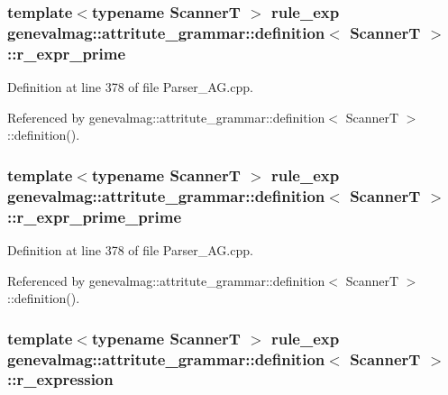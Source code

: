 \hypertarget{structgenevalmag_1_1attritute__grammar_1_1definition_ac8e35c6d00b378efb3015a9e4158f4cf}{
\subsubsection[{r\_\-expr\_\-prime}]{\setlength{\rightskip}{0pt plus 5cm}template$<$typename ScannerT $>$ {\bf rule\_\-exp} {\bf genevalmag::attritute\_\-grammar::definition}$<$ ScannerT $>$::{\bf r\_\-expr\_\-prime}}}
\label{structgenevalmag_1_1attritute__grammar_1_1definition_ac8e35c6d00b378efb3015a9e4158f4cf}


Definition at line 378 of file Parser\_\-AG.cpp.



Referenced by genevalmag::attritute\_\-grammar::definition$<$ ScannerT $>$::definition().

\hypertarget{structgenevalmag_1_1attritute__grammar_1_1definition_a0b218dc1d0e2483e9d87ffd9e14684cd}{
\subsubsection[{r\_\-expr\_\-prime\_\-prime}]{\setlength{\rightskip}{0pt plus 5cm}template$<$typename ScannerT $>$ {\bf rule\_\-exp} {\bf genevalmag::attritute\_\-grammar::definition}$<$ ScannerT $>$::{\bf r\_\-expr\_\-prime\_\-prime}}}
\label{structgenevalmag_1_1attritute__grammar_1_1definition_a0b218dc1d0e2483e9d87ffd9e14684cd}


Definition at line 378 of file Parser\_\-AG.cpp.



Referenced by genevalmag::attritute\_\-grammar::definition$<$ ScannerT $>$::definition().

\hypertarget{structgenevalmag_1_1attritute__grammar_1_1definition_ab9e3433766abc53ec6c8c3cccbe57b8b}{
\subsubsection[{r\_\-expression}]{\setlength{\rightskip}{0pt plus 5cm}template$<$typename ScannerT $>$ {\bf rule\_\-exp} {\bf genevalmag::attritute\_\-grammar::definition}$<$ ScannerT $>$::{\bf r\_\-expression}}}
\label{structgenevalmag_1_1attritute__grammar_1_1definition_ab9e3433766abc53ec6c8c3cccbe57b8b}


